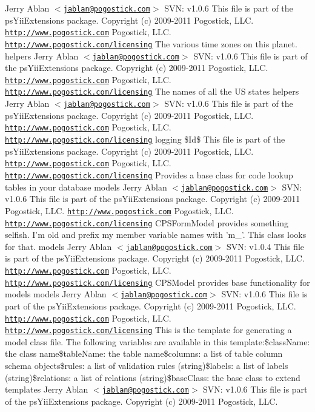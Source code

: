  Jerry Ablan $<$\href{mailto:jablan@pogostick.com}{\tt jablan@pogostick.com}$>$  SVN:   v1.0.6    This file is part of the psYiiExtensions package.   Copyright (c) 2009-\/2011 Pogostick, LLC.  \href{http://www.pogostick.com}{\tt http://www.pogostick.com} Pogostick, LLC.  \href{http://www.pogostick.com/licensing}{\tt http://www.pogostick.com/licensing} The various time zones on this planet.   helpers   Jerry Ablan $<$\href{mailto:jablan@pogostick.com}{\tt jablan@pogostick.com}$>$  SVN:   v1.0.6    This file is part of the psYiiExtensions package.   Copyright (c) 2009-\/2011 Pogostick, LLC.  \href{http://www.pogostick.com}{\tt http://www.pogostick.com} Pogostick, LLC.  \href{http://www.pogostick.com/licensing}{\tt http://www.pogostick.com/licensing} The names of all the US states   helpers   Jerry Ablan $<$\href{mailto:jablan@pogostick.com}{\tt jablan@pogostick.com}$>$  SVN:   v1.0.6    This file is part of the psYiiExtensions package.   Copyright (c) 2009-\/2011 Pogostick, LLC.  \href{http://www.pogostick.com}{\tt http://www.pogostick.com} Pogostick, LLC.  \href{http://www.pogostick.com/licensing}{\tt http://www.pogostick.com/licensing}   logging   \$Id\$  This file is part of the psYiiExtensions package.   Copyright (c) 2009-\/2011 Pogostick, LLC.  \href{http://www.pogostick.com}{\tt http://www.pogostick.com} Pogostick, LLC.  \href{http://www.pogostick.com/licensing}{\tt http://www.pogostick.com/licensing} Provides a base class for code lookup tables in your database   models   Jerry Ablan $<$\href{mailto:jablan@pogostick.com}{\tt jablan@pogostick.com}$>$  SVN:   v1.0.6    This file is part of the psYiiExtensions package.   Copyright (c) 2009-\/2011 Pogostick, LLC.  \href{http://www.pogostick.com}{\tt http://www.pogostick.com} Pogostick, LLC.  \href{http://www.pogostick.com/licensing}{\tt http://www.pogostick.com/licensing} CPSFormModel provides something selfish. I'm old and prefix my member variable names with 'm\_\-'. This class looks for that.   models   Jerry Ablan $<$\href{mailto:jablan@pogostick.com}{\tt jablan@pogostick.com}$>$  SVN:   v1.0.4    This file is part of the psYiiExtensions package.   Copyright (c) 2009-\/2011 Pogostick, LLC.  \href{http://www.pogostick.com}{\tt http://www.pogostick.com} Pogostick, LLC.  \href{http://www.pogostick.com/licensing}{\tt http://www.pogostick.com/licensing} CPSModel provides base functionality for models   models   Jerry Ablan $<$\href{mailto:jablan@pogostick.com}{\tt jablan@pogostick.com}$>$  SVN:   v1.0.6    This file is part of the psYiiExtensions package.   Copyright (c) 2009-\/2011 Pogostick, LLC.  \href{http://www.pogostick.com}{\tt http://www.pogostick.com} Pogostick, LLC.  \href{http://www.pogostick.com/licensing}{\tt http://www.pogostick.com/licensing} This is the template for generating a model class file. The following variables are available in this template:\$className: the class name\$tableName: the table name\$columns: a list of table column schema objects\$rules: a list of validation rules (string)\$labels: a list of labels (string)\$relations: a list of relations (string)\$baseClass: the base class to extend   templates   Jerry Ablan $<$\href{mailto:jablan@pogostick.com}{\tt jablan@pogostick.com}$>$  SVN:   v1.0.6    This file is part of the psYiiExtensions package.   Copyright (c) 2009-\/2011 Pogostick, LLC.  